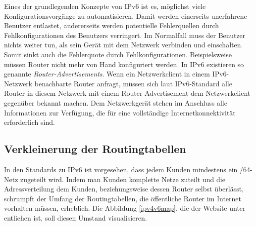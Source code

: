 \documentclass[a4paper,12pt]{scrartcl}
\begin{document}
Eines der grundlegenden Konzepte von IPv6 ist es, möglichst viele Konfigurationsvorgänge zu automatisieren. Damit werden einerseits unerfahrene Benutzer entlastet, andererseits werden potentielle Fehlerquellen durch Fehlkonfigurationen des Benutzers verringert.  Im Normalfall muss der Benutzer nichts weiter tun, als sein Ger\"at mit dem Netzwerk verbinden und einschalten. Somit sinkt auch die Fehlerquote durch Fehlkonfigurationen. Beispielsweise m\"ussen Router nicht mehr von Hand konfiguriert werden. In IPv6 existieren so genannte \textit{Router-Advertisements}. Wenn ein Netzwerkclient in einem IPv6-Netzwerk benachbarte Router anfragt, m\"ussen sich laut IPv6-Standard alle Router in diesem Netzwerk mit einem Router-Advertisement dem Netzwerkclient gegen\"uber bekannt machen. Dem Netzwerkger\"at stehen im Anschluss alle Informationen zur Verf\"ugung, die f\"ur eine vollst\"andige Internetkonnektivit\"at erforderlich sind. 

\subsection{Verkleinerung der Routingtabellen}
In den Standards zu IPv6 ist vorgesehen, dass jedem Kunden mindestens ein /64-Netz zugeteilt wird. Indem man Kunden komplette Netze zuteilt und die Adressverteilung dem Kunden, beziehungsweise dessen Router selbst überlässt, schrumpft der Umfang der Routingtabellen, die öffentliche Router im Internet vorhalten müssen, erheblich. Die Abbildung \ref{ipv4v6map}, die der Website unter \cite{ipv4v6map} entliehen ist, soll diesen Umstand visualisieren.
\end{document}
